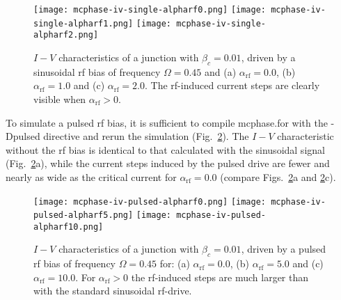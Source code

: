 \begin{figure}[bh]
{
	\fboxsep=0pt
	\mbox{\texttt{[image: mcphase-iv-single-alpharf0.png]}}
	\hfill
	\mbox{\texttt{[image: mcphase-iv-single-alpharf1.png]}}
	\hfill
	\mbox{\texttt{[image: mcphase-iv-single-alpharf2.png]}}
}
	\caption{$I - V$ characteristics of a junction with $\beta_c = 0.01$, driven by a sinusoidal rf bias of frequency $\Omega = 0.45$ and (a) $\alpha_\mathrm{rf} = 0.0$, (b) $\alpha_\mathrm{rf} = 1.0$ and (c) $\alpha_\mathrm{rf} = 2.0$. The rf-induced current steps are clearly visible when $\alpha_\mathrm{rf} > 0$.}
	\label{fig:mcphase-iv-single}
\end{figure}


To simulate a pulsed rf bias, it is sufficient to compile \textsf{mcphase.for} with the \textsf{-Dpulsed} directive and rerun the simulation (Fig.~\ref{fig:mcphase-iv-pulsed}). 
The $I - V$ characteristic without the rf bias is identical to that calculated with the sinusoidal signal (Fig.~\ref{fig:mcphase-iv-pulsed}a), while the current steps induced by the pulsed drive are fewer and nearly as wide as the critical current for $\alpha_\mathrm{rf} = 0.0$ (compare Figs.~\ref{fig:mcphase-iv-pulsed}a and \ref{fig:mcphase-iv-pulsed}c).


\begin{figure}[bh]
{
	\fboxsep=0pt
	\mbox{\texttt{[image: mcphase-iv-pulsed-alpharf0.png]}}
	\hfill
	\mbox{\texttt{[image: mcphase-iv-pulsed-alpharf5.png]}}
	\hfill
	\mbox{\texttt{[image: mcphase-iv-pulsed-alpharf10.png]}}
}
	\caption{$I - V$ characteristics of a junction with $\beta_c = 0.01$, driven by a pulsed rf bias of frequency $\Omega = 0.45$ for: (a) $\alpha_\mathrm{rf} = 0.0$, (b) $\alpha_\mathrm{rf} = 5.0$ and (c) $\alpha_\mathrm{rf} = 10.0$. For $\alpha_\mathrm{rf} > 0$ the rf-induced steps are much larger than with the standard sinusoidal rf-drive.}
	\label{fig:mcphase-iv-pulsed}
\end{figure}


